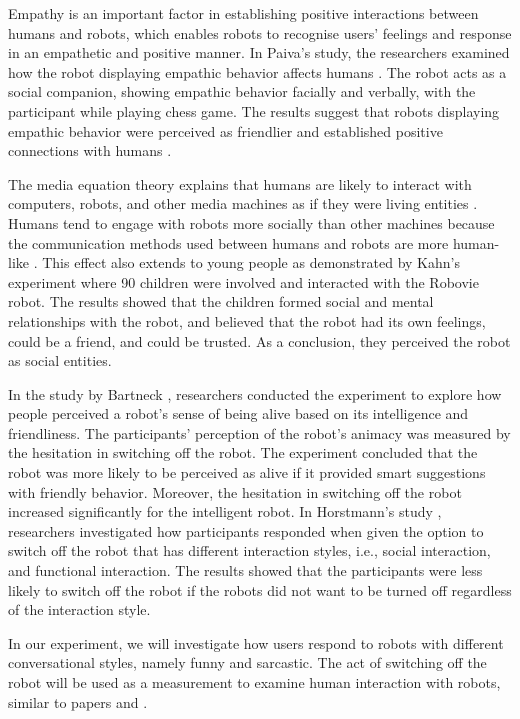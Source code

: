 \documentclass[conference]{IEEEtran}
\begin{document}
Empathy is an important factor in establishing positive interactions between humans and robots, which enables robots to recognise users’ feelings and response in an empathetic and positive manner. In Paiva's study, the researchers examined how the robot displaying empathic behavior affects humans \cite{leite_influence_2013}. The robot acts as a social companion, showing empathic behavior facially and verbally, with the participant while playing chess game. The results suggest that  robots displaying empathic behavior were perceived as friendlier and established positive connections with humans \cite{leite_influence_2013}.

The media equation theory explains that humans are likely to interact with computers, robots, and other media machines as if they were living entities \cite{reeves_media_1996}. Humans tend to engage with robots more socially than other machines because the communication methods used between humans and robots are more human-like \cite{horstmann_robots_2018}. This effect also extends to young people as demonstrated by Kahn's experiment \cite{kahn_jr_robovie_2012} where 90 children were involved and interacted with the Robovie robot. The results showed that the children formed social and mental relationships with the robot, and believed that the robot had its own feelings, could be a friend, and could be trusted. As a conclusion, they perceived the robot as social entities.

In the study by Bartneck \cite{bartneck_daisy_2007}, researchers conducted the experiment to explore how people perceived a robot's sense of being alive based on its intelligence and friendliness. The participants' perception of the robot's animacy was measured by the hesitation in switching off the robot. The experiment concluded  that the robot was more likely to be perceived as alive if it provided smart suggestions with friendly behavior. Moreover, the hesitation in switching off the robot increased significantly for the intelligent robot. In Horstmann's study \cite{horstmann_robots_2018}, researchers investigated how participants responded when given the option to switch off the robot that has different interaction styles, i.e., social interaction, and functional interaction. The results showed that the participants were less likely to switch off the robot if the robots did not want to be turned off regardless of the interaction style.

In our experiment, we will investigate how users respond to robots with different conversational styles, namely funny and sarcastic. The act of switching off the robot will be used as a measurement to examine human interaction with robots, similar to papers \cite{horstmann_robots_2018} and \cite{bartneck_daisy_2007}.
\end{document}
